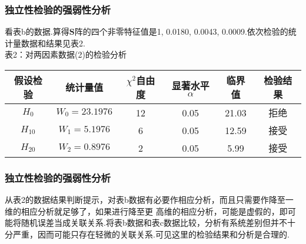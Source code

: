 \begin{frame}\frametitle{\color{blue}独立性检验的强弱性分析}
 \begin{footnotesize}
   \quad\quad 看表b的数据.算得$\mathbf{S}$阵的四个非零特征值是1, 0.0180, 0.0043,
  0.0009.依次检验的统计量数据和结果见表2.\\
\centering
 表2：对两因素数据(2)的检验分析
\begin{table}[!htbp]
\xiaowu
\begin{center}
\begin{tabular}{c|c c c c c}                                    \hline
      假设检验     & 统计量值      &$\chi^{2}$自由度&显著水平$\alpha$ & 临界值 &检验结果              \\\hline
     \quad$H_{0}$ &$W_{0}=23.1976$&12              &0.05             &21.03   &拒绝  \\
      \quad$H_{10}$&$W_{1}=5.1976$ &6               &0.05             &12.59  &接受  \\
     \quad$H_{20}$&$W_{2}=0.8976$ &2               &0.05             &5.99   &接受    \\ \hline
\end{tabular}
\end{center}
\end{table}
\end{footnotesize}
\end{frame}
\begin{frame}\frametitle{\color{blue}独立性检验的强弱性分析}
 \begin{footnotesize}
   \quad\quad
   从表2的数据结果判断提示，对表b数据有必要作相应分析，而且只需要作降至一维的相应分析就足够了，如果进行降至更
高维的相应分析，可能是虚假的，即可能将随机误差当成关联关系.将表b数据和表c数据比较，分析有系统差别但并不十
分严重，因而可能只存在轻微的关联关系.可见这里的检验结果和分析是合理的.
\end{footnotesize}
\end{frame}


